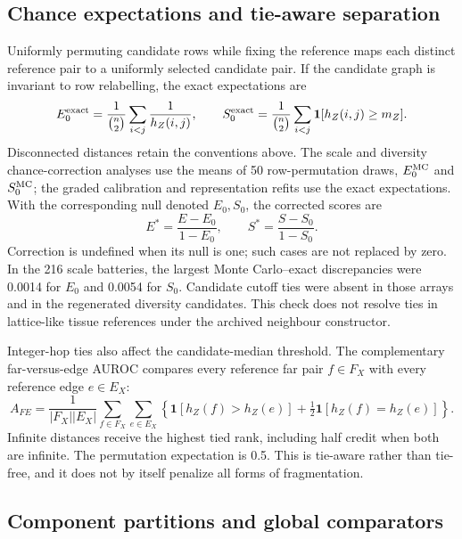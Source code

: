 \documentclass[11pt]{article}
\begin{document}
\subsection{Chance expectations and tie-aware separation}

Uniformly permuting candidate rows while fixing the reference maps each distinct reference pair to a uniformly selected candidate pair. If the candidate graph is invariant to row relabelling, the exact expectations are
\begin{equation}
 E_0^{\rm exact}=\frac{1}{\binom n2}\sum_{i<j}\frac{1}{h_Z(i,j)},\qquad
 S_0^{\rm exact}=\frac{1}{\binom n2}\sum_{i<j}\mathbf 1[h_Z(i,j)\geq m_Z].
\end{equation}
Disconnected distances retain the conventions above. The scale and diversity chance-correction analyses use the means of 50 row-permutation draws, $E_0^{\rm MC}$ and $S_0^{\rm MC}$; the graded calibration and representation refits use the exact expectations. With the corresponding null denoted $E_0,S_0$, the corrected scores are
\begin{equation}
 E^*=\frac{E-E_0}{1-E_0},\qquad S^*=\frac{S-S_0}{1-S_0}.\label{eq:corrected}
\end{equation}
Correction is undefined when its null is one; such cases are not replaced by zero. In the 216 scale batteries, the largest Monte Carlo--exact discrepancies were 0.0014 for $E_0$ and 0.0054 for $S_0$. Candidate cutoff ties were absent in those arrays and in the regenerated diversity candidates. This check does not resolve ties in lattice-like tissue references under the archived neighbour constructor.

Integer-hop ties also affect the candidate-median threshold. The complementary far-versus-edge AUROC compares every reference far pair $f\in F_X$ with every reference edge $e\in E_X$:
\begin{equation}
 A_{FE}=\frac{1}{|F_X||E_X|}\sum_{f\in F_X}\sum_{e\in E_X}
 \left\{\mathbf 1[h_Z(f)>h_Z(e)]+\tfrac12\mathbf 1[h_Z(f)=h_Z(e)]\right\}.
\end{equation}
Infinite distances receive the highest tied rank, including half credit when both are infinite. The permutation expectation is 0.5. This is tie-aware rather than tie-free, and it does not by itself penalize all forms of fragmentation.

\subsection{Component partitions and global comparators}
\end{document}
